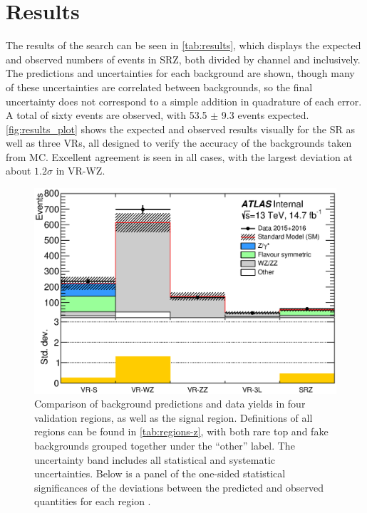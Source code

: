 
\chapter{Results} %

\label{ch:results} 

The results of the search can be seen in \autoref{tab:results}, which displays the expected and observed numbers of events in SRZ, both divided by channel and inclusively. The predictions and uncertainties for each background are shown, though many of these uncertainties are correlated between backgrounds, so the final uncertainty does not correspond to a simple addition in quadrature of each error. A total of sixty events are observed, with 53.5 $\pm$ 9.3 events expected. \autoref{fig:results_plot} shows the expected and observed results visually for the \ac{SR} as well as three \acp{VR}, all designed to verify the accuracy of the backgrounds taken from \ac{MC}. Excellent agreement is seen in all cases, with the largest deviation at about $1.2\sigma$ in VR-WZ.

\begin{centering}
\begin{figure}[!hbt]
\myfloatalign
\includegraphics[width=.9\linewidth]{figures/results/makeSummaryPlot_linear.eps}
\caption{Comparison of background predictions and data yields in four validation regions, as well as the signal region. Definitions of all regions can be found in \autoref{tab:regions-z}, with both rare top and fake backgrounds grouped together under the ``other'' label. The uncertainty band includes all statistical and systematic uncertainties. Below is a panel of the one-sided statistical significances of the deviations between the predicted and observed quantities for each region \cite{this_paper}.}
\label{fig:results_plot}
\end{figure}
\end{centering}

